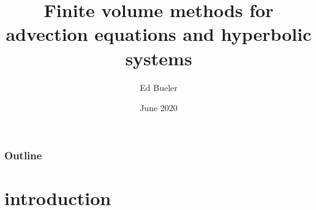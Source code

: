 \documentclass[10pt,hyperref,dvipsnames]{beamer}
\title[Finite volume methods]{Finite volume methods for \\ advection equations and hyperbolic systems}
\author{Ed Bueler}
\institute[UAF]{University of Alaska Fairbanks}
\date{June 2020}
\begin{document}
\beamertemplatenavigationsymbolsempty

\begin{frame}
  \maketitle
\end{frame}

\begin{frame}
  \frametitle{Outline}
  \tableofcontents[hideallsubsections]
\end{frame}



\section{introduction}
\end{document}
